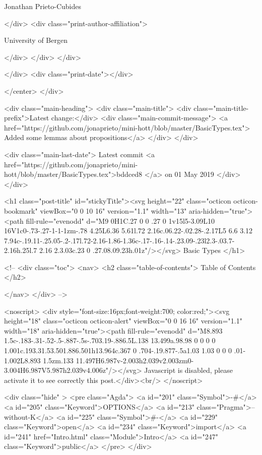                   Jonathan Prieto-Cubides
                
              </div>
              <div class="print-author-affiliation">
                
                  University of Bergen
                
                </div>
            </div>
          </div>
          
          
        </div>
        <div class="print-date"></div>
        
        
    </center>
  </div>

  
  <div class="main-heading">
    <div class="main-title">
      <div class="main-title-prefix">Latest change:</div>
      <div class="main-commit-message">
            <a href="https://github.com/jonaprieto/mini-hott/blob/master/BasicTypes.tex">
              Added some lemmas about propositions</a>
      </div>
    </div>

    <div class="main-last-date">
      Latest commit <a href="https://github.com/jonaprieto/mini-hott/blob/master/BasicTypes.tex">bddced8 </a> on  01 May 2019
    </div>
  </div>
  
  <h1 class="post-title" id="stickyTitle"><svg height="22" class="octicon octicon-bookmark" viewBox="0 0 10 16" version="1.1" width="13" aria-hidden="true"><path fill-rule="evenodd" d="M9 0H1C.27 0 0 .27 0 1v15l5-3.09L10 16V1c0-.73-.27-1-1-1zm-.78 4.25L6.36 5.61l.72 2.16c.06.22-.02.28-.2.17L5 6.6 3.12 7.94c-.19.11-.25.05-.2-.17l.72-2.16-1.86-1.36c-.17-.16-.14-.23.09-.23l2.3-.03.7-2.16h.25l.7 2.16 2.3.03c.23 0 .27.08.09.23h.01z"/></svg> Basic Types
  </h1>

  <!-- 
  <div class="toc">
    <nav>
    <h2 class="table-of-contents"> Table of Contents </h2>
      

    </nav>
  </div>
   -->

  <noscript>
  <div style="font-size:16px;font-weight:700; color:red;"><svg height="18" class="octicon octicon-alert" viewBox="0 0 16 16" version="1.1" width="18" aria-hidden="true"><path fill-rule="evenodd" d="M8.893 1.5c-.183-.31-.52-.5-.887-.5s-.703.19-.886.5L.138 13.499a.98.98 0 0 0 0 1.001c.193.31.53.501.886.501h13.964c.367 0 .704-.19.877-.5a1.03 1.03 0 0 0 .01-1.002L8.893 1.5zm.133 11.497H6.987v-2.003h2.039v2.003zm0-3.004H6.987V5.987h2.039v4.006z"/></svg> Javascript is disabled, please activate it to see correctly this post.</div><br/>
  </noscript>

  <div class="hide" >
<pre class="Agda">
<a id="201" class="Symbol">{-#</a> <a id="205" class="Keyword">OPTIONS</a> <a id="213" class="Pragma">--without-K</a> <a id="225" class="Symbol">#-}</a>
<a id="229" class="Keyword">open</a> <a id="234" class="Keyword">import</a> <a id="241" href="Intro.html" class="Module">Intro</a> <a id="247" class="Keyword">public</a>
</pre>
</div>

